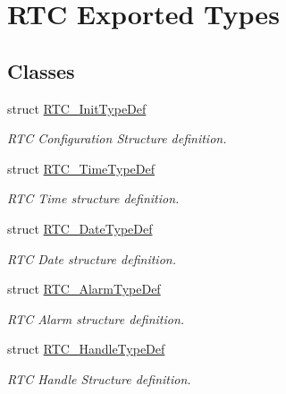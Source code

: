 \hypertarget{group___r_t_c___exported___types}{}\section{R\+TC Exported Types}
\label{group___r_t_c___exported___types}
\subsection*{Classes}
\begin{DoxyCompactItemize}
\item 
struct \hyperlink{struct_r_t_c___init_type_def}{R\+T\+C\+\_\+\+Init\+Type\+Def}
\begin{DoxyCompactList}\small\item\em R\+TC Configuration Structure definition. \end{DoxyCompactList}\item 
struct \hyperlink{struct_r_t_c___time_type_def}{R\+T\+C\+\_\+\+Time\+Type\+Def}
\begin{DoxyCompactList}\small\item\em R\+TC Time structure definition. \end{DoxyCompactList}\item 
struct \hyperlink{struct_r_t_c___date_type_def}{R\+T\+C\+\_\+\+Date\+Type\+Def}
\begin{DoxyCompactList}\small\item\em R\+TC Date structure definition. \end{DoxyCompactList}\item 
struct \hyperlink{struct_r_t_c___alarm_type_def}{R\+T\+C\+\_\+\+Alarm\+Type\+Def}
\begin{DoxyCompactList}\small\item\em R\+TC Alarm structure definition. \end{DoxyCompactList}\item 
struct \hyperlink{struct_r_t_c___handle_type_def}{R\+T\+C\+\_\+\+Handle\+Type\+Def}
\begin{DoxyCompactList}\small\item\em R\+TC Handle Structure definition. \end{DoxyCompactList}\end{DoxyCompactItemize}
